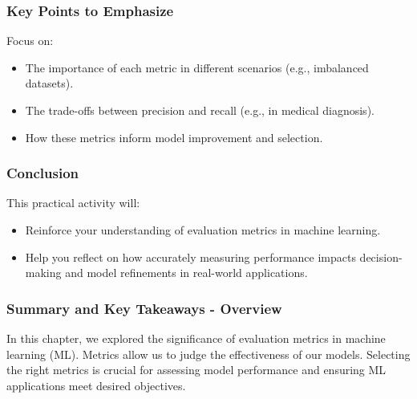 \documentclass[aspectratio=169]{beamer}
\begin{document}
\begin{frame}[fragile]
    \frametitle{Key Points to Emphasize}
    Focus on:
    \begin{itemize}
        \item The importance of each metric in different scenarios (e.g., imbalanced datasets).
        \item The trade-offs between precision and recall (e.g., in medical diagnosis).
        \item How these metrics inform model improvement and selection.
    \end{itemize}
\end{frame}

\begin{frame}[fragile]
    \frametitle{Conclusion}
    This practical activity will:
    \begin{itemize}
        \item Reinforce your understanding of evaluation metrics in machine learning.
        \item Help you reflect on how accurately measuring performance impacts decision-making and model refinements in real-world applications.
    \end{itemize}
\end{frame}

\begin{frame}[fragile]
    \frametitle{Summary and Key Takeaways - Overview}
    In this chapter, we explored the significance of evaluation metrics in machine learning (ML). Metrics allow us to judge the effectiveness of our models. 
    Selecting the right metrics is crucial for assessing model performance and ensuring ML applications meet desired objectives.
\end{frame}
\end{document}
